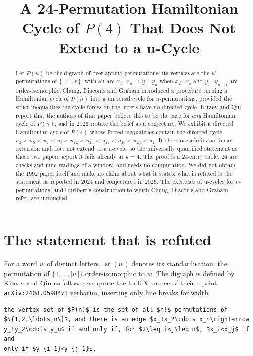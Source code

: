 \documentclass[11pt]{amsart}
\title[A Hamiltonian cycle of $P(4)$ that does not extend to a u-cycle]
{A 24-Permutation Hamiltonian Cycle of $P(4)$ That Does Not Extend to a
u-Cycle}
\date{}
\DeclareMathOperator{\stt}{st}
\begin{document}
\begin{abstract}
Let $P(n)$ be the digraph of overlapping permutations: its vertices are the
$n!$ permutations of $\{1,\dots,n\}$, with an arc $x_1\cdots x_n\to
y_1\cdots y_n$ when $x_2\cdots x_n$ and $y_1\cdots y_{n-1}$ are
order-isomorphic. Chung, Diaconis and Graham introduced a procedure turning a
Hamiltonian cycle of $P(n)$ into a universal cycle for $n$-permutations,
provided the strict inequalities the cycle forces on the letters have no
directed cycle. Kitaev and Qiu report that the authors of that paper believe
this to be the case for \emph{any} Hamiltonian cycle of $P(n)$, and in 2026
restate the belief as a conjecture. We exhibit a directed Hamiltonian cycle of
$P(4)$ whose forced inequalities contain the directed cycle
$u_2<u_5<u_7<u_9<u_{12}<u_{14}<u_{17}<u_{20}<u_{23}<u_2$. It therefore admits
no linear extension and does not extend to a u-cycle, so the universally
quantified statement as those two papers report it fails already at $n=4$. The
proof is a $24$-entry table, $24$ arc checks and nine readings of a window, and
needs no computation. We did not obtain the 1992 paper itself and make no claim
about what it states: what is refuted is the statement as reported in 2024 and
conjectured in 2026. The existence of u-cycles for $n$-permutations, and
Hurlbert's construction to which Chung, Diaconis and Graham refer, are
untouched.
\end{abstract}

\maketitle

\section{The statement that is refuted}

For a word $w$ of distinct letters, $\stt(w)$ denotes its standardisation: the
permutation of $\{1,\dots,|w|\}$ order-isomorphic to $w$. The digraph is
defined by Kitaev and Qiu \cite{KQ2024} as follows; we quote the \LaTeX{}
source of their e-print \texttt{arXiv:2408.05984v1} verbatim, inserting only
line breaks for width.

{\footnotesize\begin{verbatim}
the vertex set of $P(n)$ is the set of all $n!$ permutations of
$\{1,2,\ldots,n\}$, and there is an edge $x_1x_2\cdots x_n\rightarrow
y_1y_2\cdots y_n$ if and only if, for $2\leq i<j\leq n$, $x_i<x_j$ if and
only if $y_{i-1}<y_{j-1}$.
\end{verbatim}}
\end{document}
